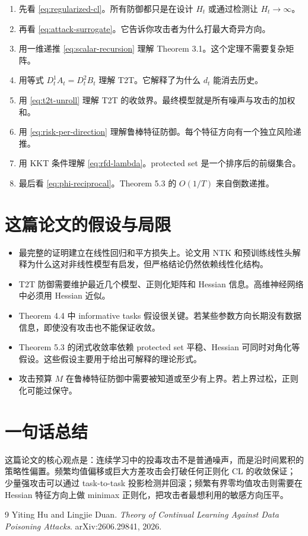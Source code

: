 \documentclass[UTF8,fontset=none,11pt]{ctexart}
\theoremstyle{cnstyle}
\begin{document}
\begin{enumerate}
  \item 先看 \eqref{eq:regularized-cl}。所有防御都只是在设计 \(H_t\) 或通过检测让 \(H_t\to\infty\)。
  \item 再看 \eqref{eq:attack-surrogate}。它告诉你攻击者为什么打最大奇异方向。
  \item 用一维递推 \eqref{eq:scalar-recursion} 理解 Theorem 3.1。这个定理不需要复杂矩阵。
  \item 用等式 \(D_t^1A_t=D_t^2B_t\) 理解 T2T。它解释了为什么 \(d_t\) 能消去历史。
  \item 用 \eqref{eq:t2t-unroll} 理解 T2T 的收敛界。最终模型就是所有噪声与攻击的加权和。
  \item 用 \eqref{eq:risk-per-direction} 理解鲁棒特征防御。每个特征方向有一个独立风险递推。
  \item 用 KKT 条件理解 \eqref{eq:rfd-lambda}。protected set 是一个排序后的前缀集合。
  \item 最后看 \eqref{eq:phi-reciprocal}。Theorem 5.3 的 \(O(1/T)\) 来自倒数递推。
\end{enumerate}

\section{这篇论文的假设与局限}

\begin{itemize}
  \item 最完整的证明建立在线性回归和平方损失上。论文用 NTK 和预训练线性头解释为什么这对非线性模型有启发，但严格结论仍然依赖线性化结构。
  \item T2T 防御需要维护最近几个模型、正则化矩阵和 Hessian 信息。高维神经网络中必须用 Hessian 近似。
  \item Theorem 4.4 中 informative tasks 假设很关键。若某些参数方向长期没有数据信息，即使没有攻击也不能保证收敛。
  \item Theorem 5.3 的闭式收敛率依赖 protected set 平稳、Hessian 可同时对角化等假设。这些假设主要用于给出可解释的理论形式。
  \item 攻击预算 \(M\) 在鲁棒特征防御中需要被知道或至少有上界。若上界过松，正则化可能过保守。
\end{itemize}

\section{一句话总结}

这篇论文的核心观点是：连续学习中的投毒攻击不是普通噪声，而是沿时间累积的策略性偏置。频繁均值偏移或巨大方差攻击会打破任何正则化 CL 的收敛保证；少量强攻击可以通过 task-to-task 投影检测并回滚；频繁有界零均值攻击则需要在 Hessian 特征方向上做 minimax 正则化，把攻击者最想利用的敏感方向压平。

\begin{thebibliography}{9}
Yiting Hu and Lingjie Duan.
\newblock \emph{Theory of Continual Learning Against Data Poisoning Attacks}.
\newblock arXiv:2606.29841, 2026.
\end{thebibliography}
\end{document}
